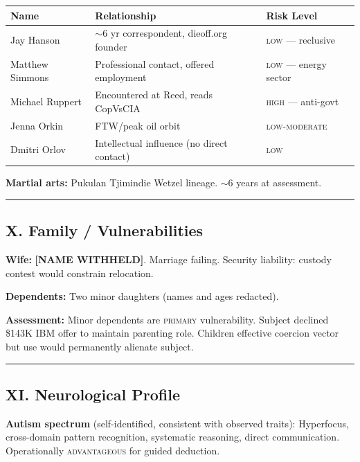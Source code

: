 {%
\small
\begin{tabular}{p{3.2cm} p{6.5cm} p{3.8cm}}
\hline
\textbf{Name} & \textbf{Relationship} & \textbf{Risk Level} \\
\hline
Jay Hanson & $\sim$6 yr correspondent, dieoff.org founder & \textsc{low} --- reclusive \\
Matthew Simmons & Professional contact, offered employment & \textsc{low} --- energy sector \\
Michael Ruppert & Encountered at Reed, reads CopVsCIA & \textsc{high} --- anti-govt \\
Jenna Orkin & FTW/peak oil orbit & \textsc{low-moderate} \\
Dmitri Orlov & Intellectual influence (no direct contact) & \textsc{low} \\
\hline
\end{tabular}
}%

\medskip

\textbf{Martial arts:} Pukulan Tjimindie Wetzel lineage. $\sim$6 years at assessment.

\vspace{1cm}\hrule\vspace{1cm}

\subsection*{X. Family / Vulnerabilities}
\label{record:tgt-family-vulnerabilities}

\textbf{Wife:} \textbf{[NAME WITHHELD]}. Marriage failing. Security liability: custody contest would constrain relocation.

\textbf{Dependents:} Two minor daughters (names and ages redacted).

\textbf{Assessment:} Minor dependents are \textsc{primary} vulnerability. Subject declined \$143K IBM offer to maintain parenting role. Children effective coercion vector but use would permanently alienate subject.

\vspace{1cm}\hrule\vspace{1cm}

\subsection*{XI. Neurological Profile}
\label{record:tgt-neurological-profile}

\textbf{Autism spectrum} (self-identified, consistent with observed traits): Hyperfocus, cross-domain pattern recognition, systematic reasoning, direct communication. Operationally \textsc{advantageous} for guided deduction.

